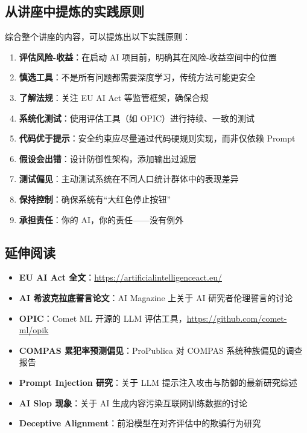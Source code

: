 \documentclass[a4paper]{article}
\begin{document}
\subsection{从讲座中提炼的实践原则}

综合整个讲座的内容，可以提炼出以下实践原则：

\begin{enumerate}
    \item \textbf{评估风险-收益}：在启动 AI 项目前，明确其在风险-收益空间中的位置
    \item \textbf{慎选工具}：不是所有问题都需要深度学习，传统方法可能更安全
    \item \textbf{了解法规}：关注 EU AI Act 等监管框架，确保合规
    \item \textbf{系统化测试}：使用评估工具（如 OPIC）进行持续、一致的测试
    \item \textbf{代码优于提示}：安全约束应尽量通过代码硬规则实现，而非仅依赖 Prompt
    \item \textbf{假设会出错}：设计防御性架构，添加输出过滤层
    \item \textbf{测试偏见}：主动测试系统在不同人口统计群体中的表现差异
    \item \textbf{保持控制}：确保系统有``大红色停止按钮''
    \item \textbf{承担责任}：你的 AI，你的责任——没有例外
\end{enumerate}

\subsection{延伸阅读}

\begin{itemize}
    \item \textbf{EU AI Act 全文}：\url{https://artificialintelligenceact.eu/}
    \item \textbf{AI 希波克拉底誓言论文}：AI Magazine 上关于 AI 研究者伦理誓言的讨论
    \item \textbf{OPIC}：Comet ML 开源的 LLM 评估工具，\url{https://github.com/comet-ml/opik}
    \item \textbf{COMPAS 累犯率预测偏见}：ProPublica 对 COMPAS 系统种族偏见的调查报告
    \item \textbf{Prompt Injection 研究}：关于 LLM 提示注入攻击与防御的最新研究综述
    \item \textbf{AI Slop 现象}：关于 AI 生成内容污染互联网训练数据的讨论
    \item \textbf{Deceptive Alignment}：前沿模型在对齐评估中的欺骗行为研究
\end{itemize}

\end{document}
